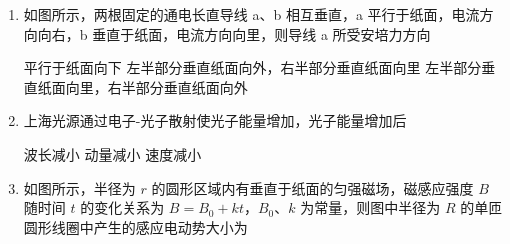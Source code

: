 \documentclass[\gkver]{gaokaozhenti}
\begin{document}
\begin{enumerate}
{	故四个灯泡中功率最大的是 $R_{1}$，A 正确，BCD 错误。

	故选 A。
}

\item
如图所示，两根固定的通电长直导线 a、b 相互垂直，a 平行于纸面，电流方向向右，b 垂直于纸面，电流方向向里，则导线 a 所受安培力方向


{平行于纸面向下}
{左半部分垂直纸面向外，右半部分垂直纸面向里}
{左半部分垂直纸面向里，右半部分垂直纸面向外}


\item
上海光源通过电子-光子散射使光子能量增加，光子能量增加后

{波长减小}
{动量减小}
{速度减小}


\item
如图所示，半径为 $r$ 的圆形区域内有垂直于纸面的匀强磁场，磁感应强度 $B$ 随时间 $t$ 的变化关系为 $B = B_{0} + kt$，$B_{0}$、$k$ 为常量，则图中半径为 $R$ 的单匝圆形线圈中产生的感应电动势大小为


\end{enumerate}
\end{document}
